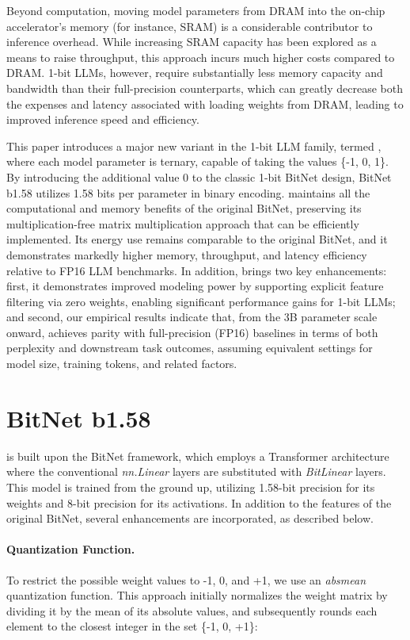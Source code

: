 Beyond computation, moving model parameters from DRAM into the on-chip accelerator’s memory (for instance, SRAM) is a considerable contributor to inference overhead. While increasing SRAM capacity has been explored as a means to raise throughput, this approach incurs much higher costs compared to DRAM. 1-bit LLMs, however, require substantially less memory capacity and bandwidth than their full-precision counterparts, which can greatly decrease both the expenses and latency associated with loading weights from DRAM, leading to improved inference speed and efficiency.

This paper introduces a major new variant in the 1-bit LLM family, termed \textbf{}, where each model parameter is ternary, capable of taking the values \{-1, 0, 1\}. By introducing the additional value 0 to the classic 1-bit BitNet design, BitNet b1.58 utilizes 1.58 bits per parameter in binary encoding.  maintains all the computational and memory benefits of the original BitNet, preserving its multiplication-free matrix multiplication approach that can be efficiently implemented. Its energy use remains comparable to the original BitNet, and it demonstrates markedly higher memory, throughput, and latency efficiency relative to FP16 LLM benchmarks. In addition,  brings two key enhancements: first, it demonstrates improved modeling power by supporting explicit feature filtering via zero weights, enabling significant performance gains for 1-bit LLMs; and second, our empirical results indicate that, from the 3B parameter scale onward,  achieves parity with full-precision (FP16) baselines in terms of both perplexity and downstream task outcomes, assuming equivalent settings for model size, training tokens, and related factors.

\section{BitNet b1.58}

 is built upon the BitNet framework, which employs a Transformer architecture where the conventional \emph{nn.Linear} layers are substituted with \emph{BitLinear} layers. This model is trained from the ground up, utilizing 1.58-bit precision for its weights and 8-bit precision for its activations. In addition to the features of the original BitNet, several enhancements are incorporated, as described below.

\paragraph{Quantization Function.} To restrict the possible weight values to -1, 0, and +1, we use an \emph{absmean} quantization function. This approach initially normalizes the weight matrix by dividing it by the mean of its absolute values, and subsequently rounds each element to the closest integer in the set \{-1, 0, +1\}:

